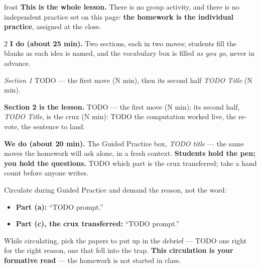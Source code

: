\documentclass[10pt]{article}
\begin{document}
\boxguard
\begin{skillbox}{frost}
\textbf{This is the whole lesson.} There is no group activity, and there is no independent
practice set on this page: \textbf{the homework is the individual practice}, assigned at the close.
\begin{multicols}{2}
\textbf{I do (about 25 min).} Two sections, each in two moves; students fill the blanks as each
idea is named, and the vocabulary box is filled \emph{as you go}, never in advance.

\emph{Section 1} TODO --- the first move (N min), then its second half \emph{TODO Title} (N min).

\textbf{Section 2 is the lesson.} TODO --- the first move (N min); its second half, \emph{TODO
Title}, is the crux (N min): TODO the computation worked live, the re-vote, the sentence to land.

\columnbreak
\textbf{We do (about 20 min).} The Guided Practice box, \emph{TODO title} --- the same moves the
homework will ask alone, in a fresh context. \textbf{Students hold the pen; you hold the
questions.} TODO which part is the crux transferred; take a hand count before anyone writes.

Circulate during Guided Practice and demand the reason, not the word:
\begin{itemize}[leftmargin=1.1em, nosep]
  \item \textbf{Part (a):} ``TODO prompt.''
  \item \textbf{Part (c), the crux transferred:} ``TODO prompt.''
\end{itemize}
While circulating, pick the papers to put up in the debrief --- TODO one right for the right
reason, one that fell into the trap. \textbf{This circulation is your formative read} --- the
homework is not started in class.
\end{multicols}
\end{skillbox}
\end{document}

